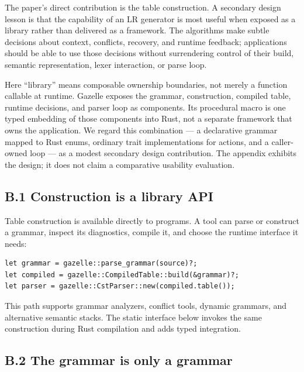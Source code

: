 \documentclass[
  10pt,
]{article}
\begin{document}
The paper's direct contribution is the table construction. A secondary
design lesson is that the capability of an LR generator is most useful
when exposed as a library rather than delivered as a framework. The
algorithms make subtle decisions about context, conflicts, recovery, and
runtime feedback; applications should be able to use those decisions
without surrendering control of their build, semantic representation,
lexer interaction, or parse loop.

Here ``library'' means composable ownership boundaries, not merely a
function callable at runtime. Gazelle exposes the grammar, construction,
compiled table, runtime decisions, and parser loop as components. Its
procedural macro is one typed embedding of those components into Rust,
not a separate framework that owns the application. We regard this
combination --- a declarative grammar mapped to Rust enums, ordinary
trait implementations for actions, and a caller-owned loop --- as a
modest secondary design contribution. The appendix exhibits the design;
it does not claim a comparative usability evaluation.

\hypertarget{b1-construction-is-a-library-api}{%
\subsection{B.1 Construction is a library
API}\label{b1-construction-is-a-library-api}}

Table construction is available directly to programs. A tool can parse
or construct a grammar, inspect its diagnostics, compile it, and choose
the runtime interface it needs:

\begin{verbatim}
let grammar = gazelle::parse_grammar(source)?;
let compiled = gazelle::CompiledTable::build(&grammar)?;
let parser = gazelle::CstParser::new(compiled.table());
\end{verbatim}

This path supports grammar analyzers, conflict tools, dynamic grammars,
and alternative semantic stacks. The static interface below invokes the
same construction during Rust compilation and adds typed integration.

\hypertarget{b2-the-grammar-is-only-a-grammar}{%
\subsection{B.2 The grammar is only a
grammar}\label{b2-the-grammar-is-only-a-grammar}}
\end{document}
